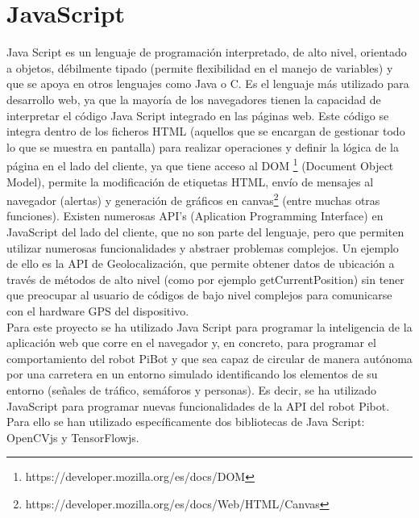 \documentclass{report}
\begin{document}
\section{JavaScript}
Java Script es un lenguaje de programación interpretado,  de alto nivel, orientado a objetos, débilmente tipado (permite flexibilidad en el manejo de variables) y que se apoya en otros lenguajes como Java o C. Es el lenguaje más utilizado para desarrollo web, ya que la mayoría de los navegadores tienen la capacidad de interpretar el código Java Script integrado en las páginas web. Este código se integra dentro de los ficheros HTML (aquellos que se encargan de gestionar todo lo que se muestra en pantalla) para realizar operaciones y definir la lógica de la página en el lado del cliente, ya que tiene acceso al DOM \footnote{https://developer.mozilla.org/es/docs/DOM} (Document Object Model),  permite la modificación de etiquetas HTML, envío de mensajes al navegador (alertas) y generación de gráficos en canvas\footnote{https://developer.mozilla.org/es/docs/Web/HTML/Canvas} (entre  muchas otras funciones). Existen numerosas API's (Aplication Programming Interface) en JavaScript del lado del cliente, que no son parte del lenguaje, pero que permiten utilizar numerosas funcionalidades y abstraer problemas complejos. Un ejemplo de ello es la API de Geolocalización, que permite obtener datos de ubicación a través de métodos de alto nivel (como por ejemplo getCurrentPosition) sin tener que preocupar al usuario de códigos de bajo nivel complejos para comunicarse con el hardware GPS del dispositivo. 
\\

Para este proyecto se ha utilizado Java Script para programar la inteligencia de la aplicación web que corre en el navegador y, en concreto, para programar el comportamiento del robot PiBot y que sea capaz de circular de manera autónoma por una carretera en un entorno simulado identificando los elementos de su entorno (señales de tráfico, semáforos y personas). Es decir, se ha utilizado JavaScript para programar nuevas funcionalidades de la API del robot Pibot. Para ello se han utilizado específicamente dos bibliotecas de Java Script: OpenCVjs y TensorFlowjs.
\end{document}

